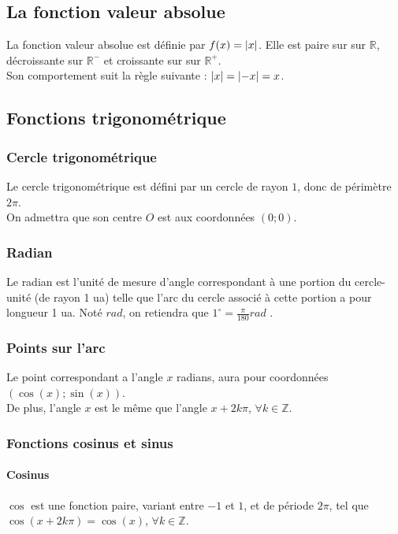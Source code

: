 \documentclass{article}
\begin{document}
\subsection{La fonction valeur absolue}
La fonction valeur absolue est définie par $f(x) = \abs{x} $. Elle est paire sur sur $\mathbb{R}$, décroissante sur $\mathbb{R^-}$ et croissante sur sur $\mathbb{R^+}$.\\
Son comportement suit la règle suivante : $\abs{x} = \abs{-x} = x$.


\subsection{Fonctions trigonométrique }

\subsubsection{Cercle trigonométrique}
Le cercle trigonométrique est défini par un cercle de rayon $1$, donc de périmètre $2\pi$.\\
On admettra que son centre $O$ est aux coordonnées $(0;0)$.

\subsubsection{Radian}
Le radian est l'unité de mesure d'angle correspondant à une portion du cercle-unité (de rayon 1 ua) telle que l'arc du cercle associé à cette portion a pour longueur 1 ua. Noté $rad$, on retiendra que $1^\circ= \frac{\pi}{180} rad$ .

\subsubsection{Points sur l'arc}
Le point correspondant a l'angle $x$ radians, aura pour coordonnées $(\cos(x);\sin(x))$. \\De plus, l'angle $x$ est le même que l'angle $x +2k\pi$, $\forall k \in \mathbb{Z}$.

\subsubsection{Fonctions cosinus et sinus}
\paragraph{Cosinus}
$\cos$ est une fonction paire, variant entre $-1$ et $1$, et de période $2\pi$, tel que $\cos(x + 2k\pi) = \cos(x)$, $\forall k \in \mathbb{Z}$.\\
\end{document}
